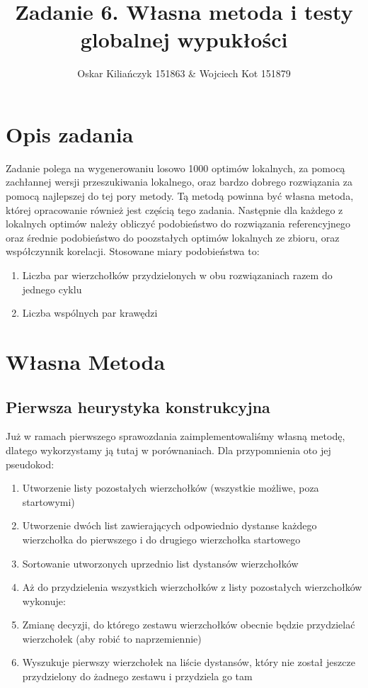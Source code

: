 \documentclass[11pt]{article}
\title{Zadanie 6. Własna metoda i testy globalnej wypukłości}
\author{Oskar Kiliańczyk 151863 \& Wojciech Kot 151879}
\date{}
\begin{document}
\maketitle
\newpage

\section{Opis zadania}\label{sec:opis-zadania}
Zadanie polega na wygenerowaniu losowo 1000 optimów lokalnych, za pomocą zachłannej wersji przeszukiwania lokalnego,
oraz bardzo dobrego rozwiązania za pomocą najlepszej do tej pory metody.
Tą metodą powinna być własna metoda, której opracowanie również jest częścią tego zadania.
Następnie dla każdego z lokalnych optimów należy obliczyć podobieństwo do rozwiązania referencyjnego oraz średnie podobieństwo do poozstałych optimów lokalnych ze zbioru, oraz współczynnik korelacji.
Stosowane miary podobieństwa to:
\begin{enumerate}
    \item Liczba par wierzchołków przydzielonych w obu rozwiązaniach razem do jednego cyklu
    \item Liczba wspólnych par krawędzi
\end{enumerate}


\section{Własna Metoda}\label{sec:wlasna-metoda}

\subsection{Pierwsza heurystyka konstrukcyjna}\label{subsec:pierwsza-heurystyka-konstukcyjna}

Już w ramach pierwszego sprawozdania zaimplementowaliśmy własną metodę, dlatego wykorzystamy ją tutaj w porównaniach.
Dla przypomnienia oto jej pseudokod:

\begin{enumerate}
    \item Utworzenie listy pozostałych wierzchołków (wszystkie możliwe, poza startowymi)
    \item Utworzenie dwóch list zawierających odpowiednio dystanse każdego wierzchołka do pierwszego i do drugiego wierzchołka startowego
    \item Sortowanie utworzonych uprzednio list dystansów wierzchołków
    \item Aż do przydzielenia wszystkich wierzchołków z listy pozostałych wierzchołków wykonuje:
    \item Zmianę decyzji, do którego zestawu wierzchołków obecnie będzie przydzielać wierzchołek (aby robić to naprzemiennie)
    \item Wyszukuje pierwszy wierzchołek na liście dystansów, który nie został jeszcze przydzielony do żadnego zestawu i przydziela go tam
\end{enumerate}
\end{document}
